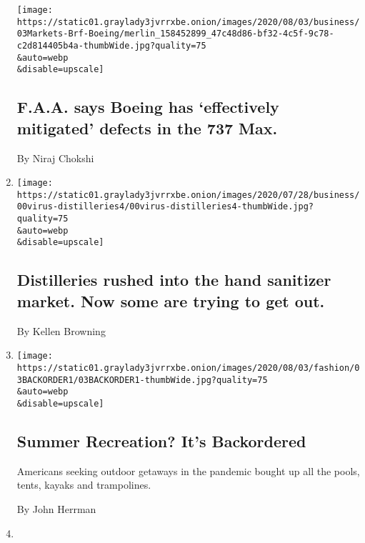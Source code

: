 \begin{enumerate}
  \texttt{[image: https://static01.graylady3jvrrxbe.onion/images/2020/08/03/business/03Markets-Brf-Boeing/merlin\_158452899\_47c48d86-bf32-4c5f-9c78-c2d814405b4a-thumbWide.jpg?quality=75\\\&auto=webp\\\&disable=upscale]}

  \hypertarget{faa-says-boeing-has-effectively-mitigated-defects-in-the-737-max}{%
  \subsection{F.A.A. says Boeing has `effectively mitigated' defects in
  the 737
  Max.}\label{faa-says-boeing-has-effectively-mitigated-defects-in-the-737-max}}

  By Niraj Chokshi
\item
  \href{/2020/08/04/business/distilleries-rushed-into-the-hand-sanitizer-market-now-some-are-trying-to-get-out.html}{}

  \texttt{[image: https://static01.graylady3jvrrxbe.onion/images/2020/07/28/business/00virus-distilleries4/00virus-distilleries4-thumbWide.jpg?quality=75\\\&auto=webp\\\&disable=upscale]}

  \hypertarget{distilleries-rushed-into-the-hand-sanitizer-market-now-some-are-trying-to-get-out}{%
  \subsection{Distilleries rushed into the hand sanitizer market. Now
  some are trying to get
  out.}\label{distilleries-rushed-into-the-hand-sanitizer-market-now-some-are-trying-to-get-out}}

  By Kellen Browning
\item
  \href{/2020/08/04/style/outdoor-camping-gear-pools-backordered.html}{}

  \texttt{[image: https://static01.graylady3jvrrxbe.onion/images/2020/08/03/fashion/03BACKORDER1/03BACKORDER1-thumbWide.jpg?quality=75\\\&auto=webp\\\&disable=upscale]}

  \hypertarget{summer-recreation-its-backordered}{%
  \subsection{Summer Recreation? It's
  Backordered}\label{summer-recreation-its-backordered}}

  Americans seeking outdoor getaways in the pandemic bought up all the
  pools, tents, kayaks and trampolines.

  By John Herrman
\item
  \href{/2020/08/04/travel/coronavirus-caribbean-vacations.html}{}


\end{enumerate}
